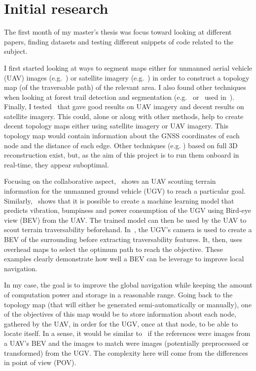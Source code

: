 \documentclass[11pt, a4paper]{article}
\begin{document}
    


    \section{Initial research}\label{sec:initial-research}

    The first month of my master's thesis was focus toward looking at different papers, finding datasets and testing
    different snippets of code related to the subject.

    I first started looking at ways to segment maps either for unmanned aerial vehicle (UAV) images (e.g.~\cite{khan_visual_2012}) or satellite imagery
    (e.g.~\cite{sofman_terrain_2006}) in order to construct a topology map (of the traversable path) of the relevant area.
    I also found other techniques when looking at forest trail detection and segmentation (e.g.~\cite{giusti_machine_2016}
    or~\cite{rufus_blas_fast_2008} used in~\cite{rasmussen_appearance_2009}).
    Finally, I tested~\cite{bosch_journal_2020} that gave good results on UAV imagery and decent results on satellite imagery.
    This could, alone or along with other methods, help to create decent topology maps either using satellite imagery or UAV imagery.
    This topology map would contain information about the GNSS coordinates of each node and the distance of each edge.
    Other techniques (e.g. \cite{wang_2d_2021}) based on full 3D reconstruction exist, but,
    as the aim of this project is to run them onboard in real-time, they appear suboptimal.

    Focusing on the collaborative aspect,~\cite{delmerico_active_2017} shows an UAV scouting terrain information for
    the unmanned ground vehicle (UGV) to reach a particular goal.
    Similarly,~\cite{fortin_uav-assisted_2024} shows that it is possible to create a machine learning model that predicts
    vibration, bumpiness and power consumption of the UGV using Bird-eye view (BEV) from the UAV.
    The trained model can then be used by the UAV to scout terrain traversability beforehand.
    In~\cite{zhang_dual-bev_2025}, the UGV's camera is used to create a BEV of the surrounding before extracting
    traversability features.
    It, then, uses overhead maps to select the optimum path to reach the objective.
    These examples clearly demonstrate how well a BEV can be leverage to improve local navigation.

    In my case, the goal is to improve the global navigation while keeping the amount of computation power and storage
    in a reasonable range.
    Going back to the topology map (that will either be generated semi-automatically or manually),
    one of the objectives of this map would be to store information about each node,
    gathered by the UAV, in order for the UGV, once at that node, to be able to locate itself.
    In a sense, it would be similar to~\cite{han_effective_2020} if the references were images from a UAV's BEV
    and the images to match were images (potentially preprocessed or transformed) from the UGV.
    The complexity here will come from the differences in point of view (POV).
\end{document}
